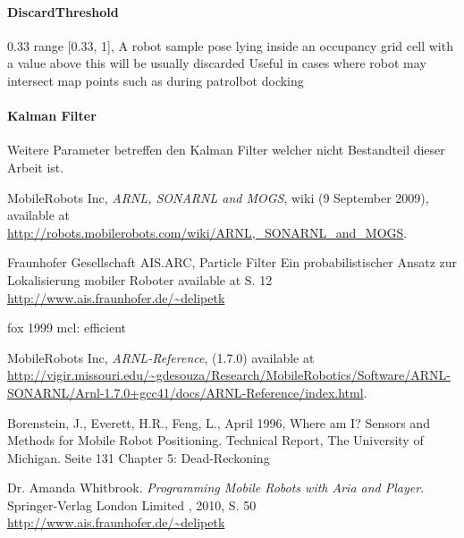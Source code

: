 \documentclass{article}
\begin{document}
\paragraph{DiscardThreshold} 0.33     range [0.33, 1],  A robot sample pose lying inside
                          an occupancy grid cell with a value above this will
                          be usually discarded Useful in cases where robot may
                          intersect map points such as during patrolbot
                          docking
\paragraph{Kalman Filter}
Weitere Parameter betreffen den Kalman Filter welcher nicht Bestandteil dieser Arbeit ist. 



\begin{thebibliography}{------}
	 MobileRobots Inc, \emph{ARNL, SONARNL and MOGS},  wiki (9 September 2009), available at 
		\url{http://robots.mobilerobots.com/wiki/ARNL,_SONARNL_and_MOGS}.
	
	
	
	 Fraunhofer Gesellschaft AIS.ARC, Particle Filter
			Ein probabilistischer Ansatz zur Lokalisierung mobiler Roboter available at S. 12
			\url{http://www.ais.fraunhofer.de/~delipetk}
	
	
	fox 1999 mcl: efficient
	
	
	 MobileRobots Inc, \emph{ARNL-Reference}, (1.7.0) available at 				
	\url{http://vigir.missouri.edu/~gdesouza/Research/MobileRobotics/Software/ARNL-SONARNL/Arnl-1.7.0+gcc41/docs/ARNL-Reference/index.html}.
	
	
	 Borenstein, J., Everett, H.R., Feng, L., April 1996, Where am I? Sensors and Methods for Mobile Robot Positioning. Technical Report, The University of Michigan. Seite 131 Chapter 5: Dead-Reckoning
	
	
		Dr. Amanda Whitbrook.
		{\em Programming Mobile Robots with Aria and Player}.
		Springer-Verlag London Limited , 2010, S. 50
		\url{http://www.ais.fraunhofer.de/~delipetk}

\end{thebibliography}
\listoffigures
\end{document}
